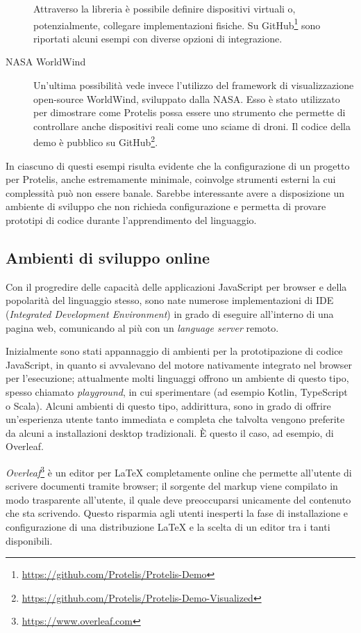 \begin{description}
      Attraverso la libreria è possibile definire dispositivi virtuali o, potenzialmente, collegare implementazioni fisiche.
      Su GitHub\footnote{\url{https://github.com/Protelis/Protelis-Demo}} sono riportati alcuni esempi con diverse opzioni di integrazione.

    \item[NASA WorldWind]\cite{4161692}
      Un'ultima possibilità vede invece l'utilizzo del framework di visualizzazione open-source WorldWind, sviluppato dalla NASA\@.
      Esso è stato utilizzato per dimostrare come Protelis possa essere uno strumento che permette di controllare anche dispositivi reali come uno sciame di droni.
      Il codice della demo è pubblico su GitHub\footnote{\url{https://github.com/Protelis/Protelis-Demo-Visualized}}.
  \end{description}

  In ciascuno di questi esempi risulta evidente che la configurazione di un progetto per Protelis, anche estremamente minimale, coinvolge strumenti esterni la cui complessità può non essere banale.
  Sarebbe interessante avere a disposizione un ambiente di sviluppo che non richieda configurazione e permetta di provare prototipi di codice durante l'apprendimento del linguaggio.

  \subsection{Ambienti di sviluppo online}\label{subsec:online-ide}

  Con il progredire delle capacità delle applicazioni JavaScript per browser e della popolarità del linguaggio stesso, sono nate numerose implementazioni di IDE (\emph{Integrated Development Environment}) in grado di eseguire all'interno di una pagina web, comunicando al più con un \emph{language server} remoto.

  Inizialmente sono stati appannaggio di ambienti per la prototipazione di codice JavaScript, in quanto si avvalevano del motore nativamente integrato nel browser per l'esecuzione;
  attualmente molti linguaggi offrono un ambiente di questo tipo, spesso chiamato \emph{playground}, in cui sperimentare (ad esempio Kotlin, TypeScript o Scala).
  Alcuni ambienti di questo tipo, addirittura, sono in grado di offrire un'esperienza utente tanto immediata e completa che talvolta vengono preferite da alcuni a installazioni desktop tradizionali.
  È questo il caso, ad esempio, di Overleaf.

  \emph{Overleaf}\footnote{\url{https://www.overleaf.com}} è un editor per \LaTeX{} completamente online che permette all'utente di scrivere documenti tramite browser;
  il sorgente del markup viene compilato in modo trasparente all'utente, il quale deve preoccuparsi unicamente del contenuto che sta scrivendo.
  Questo risparmia agli utenti inesperti la fase di installazione e configurazione di una distribuzione \LaTeX{} e la scelta di un editor tra i tanti disponibili.

